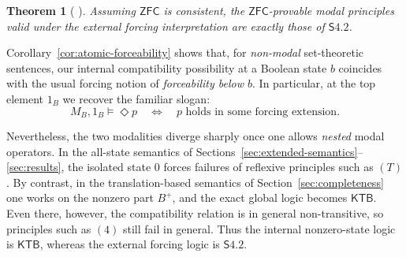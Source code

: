 \documentclass[11pt]{amsart}
\theoremstyle{definition}
\theoremstyle{plain}
\newtheorem{theorem}[definition]{Theorem}
\newcommand{\KTB}{\mathsf{KTB}}
\begin{document}
\begin{theorem}[\cite{HamkinsLowe} ]\label{thm:HamkinsLowe-S4.2}
Assuming $\mathsf{ZFC}$ is consistent, the $\mathsf{ZFC}$-provable modal principles valid under the
external forcing interpretation are exactly those of $\mathsf{S4.2}$.
\end{theorem}

Corollary~\ref{cor:atomic-forceability} shows that, for \emph{non-modal} set-theoretic sentences,
our internal compatibility possibility at a Boolean state $b$ coincides with the usual forcing notion of
\emph{forceability below $b$}. In particular, at the top element $1_B$ we recover the familiar slogan:
\[
M_B,1_B\models \Diamond p
\quad\Longleftrightarrow\quad
\text{$p$ holds in some forcing extension.}
\]

Nevertheless, the two modalities diverge sharply once one allows \emph{nested} modal operators.
In the all-state semantics of Sections~\ref{sec:extended-semantics}--\ref{sec:results}, the isolated state
$0$ forces failures of reflexive principles such as $(T)$. By contrast, in the translation-based semantics
of Section~\ref{sec:completeness} one works on the nonzero part $B^+$, and the exact global logic becomes
$\KTB$. Even there, however, the compatibility relation is in general non-transitive, so
principles such as $(4)$  still fail in general. Thus the internal nonzero-state logic is $\KTB$,
whereas the external forcing logic is $\mathsf{S4.2}$.
\end{document}
